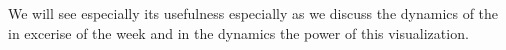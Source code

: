 We will see especially its usefulness especially as we discuss the dynamics of the in excerise of the week and in the dynamics the power of this visualization.